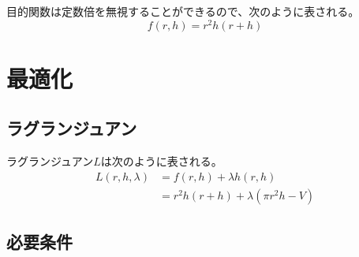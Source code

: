 \documentclass{jsarticle}
\begin{document}
目的関数は定数倍を無視することができるので、次のように表される。
\begin{equation}
  f(r, h) = r^2 h (r+h) 
\end{equation}

\section{最適化}
\subsection{ラグランジュアン}
ラグランジュアン$L$は次のように表される。
\begin{align}
  L(r, h, \lambda) &= f(r, h) + \lambda h(r, h) \\
                   &= r^2 h (r+h) + \lambda (\pi r^2 h - V)
\end{align}

\subsection{必要条件}
\end{document}
